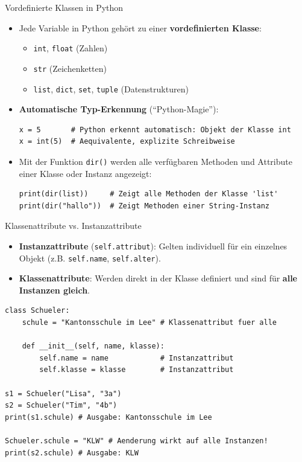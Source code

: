 \begin{frame}[fragile]{Vordefinierte Klassen in Python}
	\begin{itemize}[<+->]
		\item Jede Variable in Python gehört zu einer \textbf{vordefinierten Klasse}:
		      \begin{itemize}
			      \item \lstinline|int|, \lstinline|float| (Zahlen)
			      \item \lstinline|str| (Zeichenketten)
			      \item \lstinline|list|, \lstinline|dict|, \lstinline|set|, \lstinline|tuple| (Datenstrukturen)
		      \end{itemize}
		\item \textbf{Automatische Typ-Erkennung} (\enquote{Python-Magie}):
		      \begin{lstlisting}
x = 5       # Python erkennt automatisch: Objekt der Klasse int
x = int(5)  # Aequivalente, explizite Schreibweise
\end{lstlisting}
		\item Mit der Funktion \lstinline|dir()| werden alle verfügbaren Methoden und Attribute einer Klasse oder Instanz angezeigt:
		      \begin{lstlisting}
print(dir(list))     # Zeigt alle Methoden der Klasse 'list'
print(dir("hallo"))  # Zeigt Methoden einer String-Instanz
\end{lstlisting}
	\end{itemize}
\end{frame}

\begin{frame}[fragile]{Klassenattribute vs. Instanzattribute}
	\begin{itemize}[<+->]
		\item \textbf{Instanzattribute} (\lstinline|self.attribut|):
		      Gelten individuell für ein einzelnes Objekt (z.B. \lstinline|self.name|, \lstinline|self.alter|).
		\item \textbf{Klassenattribute}:
		      Werden direkt in der Klasse definiert und sind für \textbf{alle Instanzen gleich}.
	\end{itemize}
	\pause
	\begin{lstlisting}[basicstyle=\ttfamily\scriptsize]
class Schueler:
    schule = "Kantonsschule im Lee" # Klassenattribut fuer alle

    def __init__(self, name, klasse):
        self.name = name            # Instanzattribut
        self.klasse = klasse        # Instanzattribut

s1 = Schueler("Lisa", "3a")
s2 = Schueler("Tim", "4b")
print(s1.schule) # Ausgabe: Kantonsschule im Lee

Schueler.schule = "KLW" # Aenderung wirkt auf alle Instanzen!
print(s2.schule) # Ausgabe: KLW
\end{lstlisting}
\end{frame}

